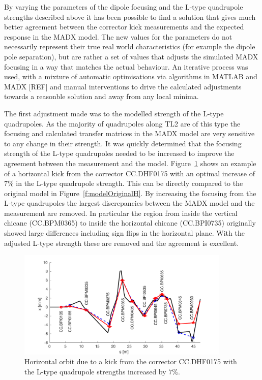 By varying the parameters of the dipole focusing and the L-type quadrupole strengths described above it has been possible to find a solution that gives much better agreement between the corrector kick measurements and the expected response in the MADX model. The new values for the parameters do not necessarily represent their true real world characteristics (for example the dipole pole separation), but are rather a set of values that adjusts the simulated MADX focusing in a way that matches the actual behaviour. An iterative process was used, with a mixture of automatic optimisations via algorithms in MATLAB and MADX [REF] and manual interventions to drive the calculated adjustments towards a reasonble solution and away from any local minima.

The first adjustment made was to the modelled strength of the L-type quadrupoles. As the majority of quadrupoles along TL2 are of this type the focusing and calculated transfer matrices in the MADX model are very sensitive to any change in their strength. It was quickly determined that the focusing strength of the L-type quadrupoles needed to be increased to improve the agreement between the measurement and the model. Figure~\ref{f:modelCorrQuadH} shows an example of a horizontal kick from the corrector CC.DHF0175 with an optimal increase of \(7\%\) in the L-type quadrupole strength. This can be directly compared to the original model in Figure~\ref{f:modelOriginalH}. By increasing the focusing from the L-type quadrupoles the largest discrepancies between the MADX model and the measurement are removed. In particular the region from inside the vertical chicane (CC.BPM0365) to inside the horizontal chicane (CC.BPI0735) originally showed large differences including sign flips in the horizontal plane. With the adjusted L-type strength these are removed and the agreement is excellent.

\begin{figure}
  \centering
  \includegraphics[width=0.9\textwidth]{Figures/optics/modelCorrQuadH}
  \caption{Horizontal orbit due to a kick from the corrector CC.DHF0175 with the L-type quadrupole strengths increased by \(7\%\).}
  \label{f:modelCorrQuadH}
\end{figure}

